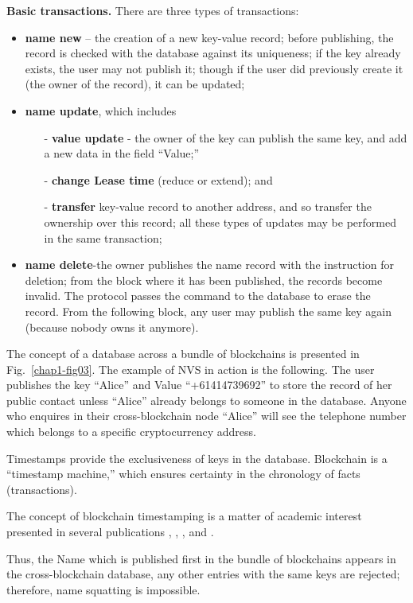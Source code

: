 \begin{multicols}{2}
\textbf{Basic transactions.} There are three types of transactions: 

\begin{itemize}
\item \textbf{name new} – the creation of a new key-value record; before publishing, the record is checked with the database against its uniqueness; if the key already exists, the user may not publish it; though if the user did previously create it (the owner of the record), it can be updated;
\item \textbf{name update}, which includes
\begin{itemize}
\item[-] \textbf{value update} - the owner of the key can publish the same key, and add a new data in the field “Value;”
\item[-] \textbf{change Lease time} (reduce or extend); and 
\item[-] \textbf{transfer} key-value record to another address, and so transfer the ownership over this record; all these types of updates may be performed in the same transaction;
\end{itemize}
\item \textbf{name delete}-the owner publishes the name record with the instruction for deletion; from the block where it has been published, the records become invalid. The protocol passes the command to the database to erase the record. From the following block, any user may publish the same key again (because nobody owns it anymore).
\end{itemize}

The concept of a database across a bundle of blockchains is presented in Fig.~\ref{chap1-fig03}. The example of NVS in action is the following. The user publishes the key “Alice” and Value “+61414739692” to store the record of her public contact unless “Alice” already belongs to someone in the database. Anyone who enquires in their cross-blockchain node “Alice” will see the telephone number which belongs to a specific cryptocurrency address.

Timestamps provide the exclusiveness of keys in the database. Blockchain is a “timestamp machine,” which ensures certainty in the chronology of facts (transactions). 

The concept of blockchain timestamping is a matter of academic interest presented in several publications \cite{art1-key29}, \cite{art1-key30}, \cite{art1-key31}, \cite{art1-key32} and \cite{art1-key33}.

Thus, the Name which is published first in the bundle of blockchains appears in the cross-blockchain database, any other entries with the same keys are rejected; therefore, name squatting is impossible.


\end{multicols}
